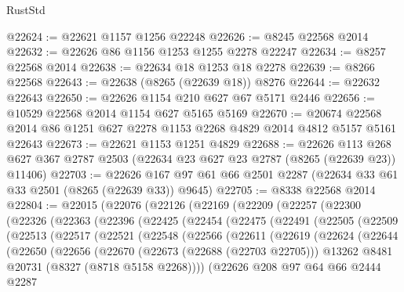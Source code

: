 \begin{lexlean}{RustStd}
\begin{coremodule}
{\begin{coremodule}
{{{{{{{{{{{{{{{{{{{{{{{{{{{{{{{{{{{{{{{{{{{{{{{{{{{{{{@22624 := @22621 @1157 @1256 @22248
@22626 := @8245 @22568 @2014
@22632 := @22626 @86 @1156 @1253 @1255 @2278 @22247
@22634 := @8257 @22568 @2014
@22638 := @22634 @18 @1253 @18 @2278
@22639 := @8266 @22568
@22643 := @22638 (@8265 (@22639 @18)) @8276
@22644 := @22632 @22643
@22650 := @22626 @1154 @210 @627 @67 @5171 @2446
@22656 := @10529 @22568 @2014 @1154 @627 @5165 @5169
@22670 := @20674 @22568 @2014 @86 @1251 @627 @2278 @1153 @2268 @4829 @2014 @4812 @5157 @5161 @22643
@22673 := @22621 @1153 @1251 @4829
@22688 := @22626
    @113
    @268
    @627
    @367
    @2787
    @2503
    (@22634 @23 @627 @23 @2787 (@8265 (@22639 @23)) @11406)
@22703 := @22626 @167 @97 @61 @66 @2501 @2287 (@22634 @33 @61 @33 @2501 (@8265 (@22639 @33)) @9645)
@22705 := @8338 @22568 @2014
@22804 := @22015
    (@22076
      (@22126
        (@22169
          (@22209
            (@22257
              (@22300
                (@22326
                  (@22363
                    (@22396
                      (@22425
                        (@22454
                          (@22475
                            (@22491
                              (@22505
                                (@22509
                                  (@22513
                                    (@22517
                                      (@22521
                                        (@22548
                                          (@22566
                                            (@22611
                                              (@22619
                                                (@22624
                                                  (@22644
                                                    (@22650
                                                      (@22656
                                                        (@22670
                                                          (@22673 (@22688 (@22703 @22705)))
                                                          @13262
                                                          @8481
                                                          @20731
                                                          (@8327 (@8718 @5158 @2268))))
                                                      (@22626
                                                        @208
                                                        @97
                                                        @64
                                                        @66
                                                        @2444
                                                        @2287
}}}}}}}}}}}}}}}}}}}}}}}}}}}}}}}}}}}}}}}}}}}}}}}}}}}}}}
\end{coremodule}}
\end{coremodule}
\end{lexlean}
